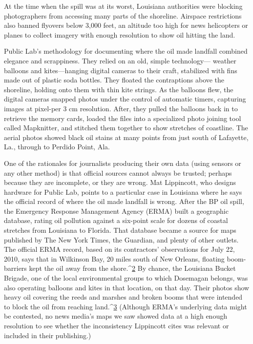 At the time when the spill was at its worst, Louisiana authorities were
blocking photographers from accessing many parts of the shoreline. Airspace
restrictions also banned flyovers below 3,000 feet, an altitude too high
for news helicopters or planes to collect imagery with enough resolution to
show oil hitting the land.

Public Lab's methodology for documenting where the oil made landfall
combined elegance and scrappiness. They relied on an old, simple technology—
weather balloons and kites—hanging digital cameras to their craft,
stabilized with fins made out of plastic soda bottles. They floated the contraptions
above the shoreline, holding onto them with thin kite strings. As
the balloons flew, the digital cameras snapped photos under the control of
automatic timers, capturing images at pixel-per 3 cm resolution. After, they
pulled the balloons back in to retrieve the memory cards, loaded the files
into a specialized photo joining tool called Mapknitter, and stitched them
together to show stretches of coastline. The aerial photos showed black oil
stains at many points from just south of Lafayette, La., through to Perdido
Point, Ala.

One of the rationales for journalists producing their own data (using sensors
or any other method) is that official sources cannot always be trusted;
perhaps because they are incomplete, or they are wrong. Mat Lippincott,
who designs hardware for Public Lab, points to a particular case in Louisiana
where he says the official record of where the oil made landfall is wrong.
After the BP oil spill, the Emergency Response Management Agency
(ERMA) built a geographic database, rating oil pollution against a six-point
scale for dozens of coastal stretches from Louisiana to Florida. That database
became a source for maps published by The New York Times, the
Guardian, and plenty of other outlets. The official ERMA record, based on
its contractors' observations for July 22, 2010, says that in Wilkinson Bay, 20
miles south of New Orleans, floating boom-barriers kept the oil away from
the shore.^{\href{#endnotes-public-lab}{2}} By chance, the Louisiana Bucket Brigade, one of the local environmental
groups to which Dosemagan belongs, was also operating balloons
and kites in that location, on that day. Their photos show heavy oil
covering the reeds and marshes and broken booms that were intended to
block the oil from reaching land.^{\href{#endnotes-public-lab}{3}} (Although ERMA's underlying data might
be contested, no news media's maps we saw showed data at a high enough
resolution to see whether the inconsistency Lippincott cites was relevant or
included in their publishing.)

